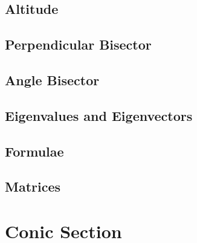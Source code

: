\documentclass[journal]{IEEEtran}
\begin{document}
\subsection{Altitude}

\subsection{Perpendicular Bisector}

\subsection{Angle Bisector}

\subsection{Eigenvalues and Eigenvectors}

\subsection{Formulae}

\subsection{Matrices}

\newpage
\section{Conic Section}

\fi
\end{document}
